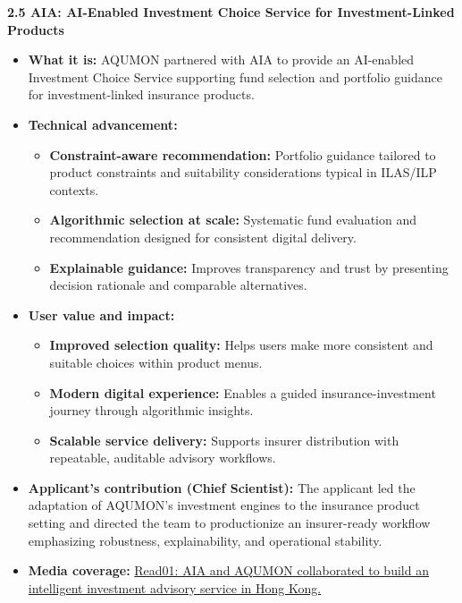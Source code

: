 \documentclass[11pt]{article}
\newcommand{\CVSubsection}[1]{\textbf{#1}\par}
\newenvironment{tightitemize}{%
  \begin{itemize}[leftmargin=*,nosep,topsep=2pt]
}{\end{itemize}}
\begin{document}
\CVSubsection{2.5 AIA: AI-Enabled Investment Choice Service for Investment-Linked Products}

\begin{tightitemize}
  \item \textbf{What it is:} AQUMON partnered with AIA to provide an AI-enabled Investment Choice Service supporting fund selection and portfolio guidance for investment-linked insurance products.
  \item \textbf{Technical advancement:}
  \begin{tightitemize}
    \item \textbf{Constraint-aware recommendation:} Portfolio guidance tailored to product constraints and suitability considerations typical in ILAS/ILP contexts.
    \item \textbf{Algorithmic selection at scale:} Systematic fund evaluation and recommendation designed for consistent digital delivery.
    \item \textbf{Explainable guidance:} Improves transparency and trust by presenting decision rationale and comparable alternatives.
  \end{tightitemize}
  \item \textbf{User value and impact:}
  \begin{tightitemize}
    \item \textbf{Improved selection quality:} Helps users make more consistent and suitable choices within product menus.
    \item \textbf{Modern digital experience:} Enables a guided insurance-investment journey through algorithmic insights.
    \item \textbf{Scalable service delivery:} Supports insurer distribution with repeatable, auditable advisory workflows.
  \end{tightitemize}
  \item \textbf{Applicant’s contribution (Chief Scientist):} The applicant led the adaptation of AQUMON’s investment engines to the insurance product setting and directed the team to productionize an insurer-ready workflow emphasizing robustness, explainability, and operational stability.
  \item \textbf{Media coverage:}
  \href{https://read01.com/zh-hk/MJEPa37.html#.YzVByOxBz0o}{Read01: AIA and AQUMON collaborated to build an intelligent investment advisory service in Hong Kong.}
\end{tightitemize}
\end{document}
